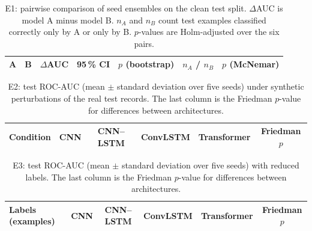 \begin{table}[h]
\caption{E1: pairwise comparison of seed ensembles on the clean test split. $\Delta$AUC is model A minus model B. $n_{A}$ and $n_{B}$ count test examples classified correctly only by A or only by B. $p$-values are Holm-adjusted over the six pairs.}\label{tab:pairs}
\centering\footnotesize\setlength{\tabcolsep}{3pt}
\begin{tabular}{llccccc}
\toprule
A & B & $\Delta$AUC & 95\,\% CI & $p$ (bootstrap) & $n_A$ / $n_B$ & $p$ (McNemar)\\
\midrule
\bottomrule
\end{tabular}
\end{table}

\begin{table}[h]
\caption{E2: test ROC-AUC (mean $\pm$ standard deviation over five seeds) under synthetic perturbations of the real test records. The last column is the Friedman $p$-value for differences between architectures.}\label{tab:noise}
\centering\footnotesize\setlength{\tabcolsep}{3pt}
\begin{tabular}{lccccc}
\toprule
Condition & CNN & CNN--LSTM & ConvLSTM & Transformer & Friedman $p$\\
\midrule
\bottomrule
\end{tabular}
\end{table}

\begin{table}[h]
\caption{E3: test ROC-AUC (mean $\pm$ standard deviation over five seeds) with reduced labels. The last column is the Friedman $p$-value for differences between architectures.}\label{tab:frac}
\centering\footnotesize\setlength{\tabcolsep}{3pt}
\begin{tabular}{lccccc}
\toprule
Labels (examples) & CNN & CNN--LSTM & ConvLSTM & Transformer & Friedman $p$\\
\midrule
\bottomrule
\end{tabular}
\end{table}

